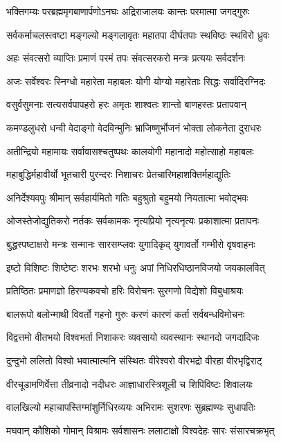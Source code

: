 \twolineshloka
{भक्तिगम्यः परब्रह्ममृगबाणार्पणोऽनघः}
{अद्रिराजालयः कान्तः परमात्मा जगद्गुरुः}

\twolineshloka
{सर्वकर्माचलस्त्वष्टा मङ्गल्यो मङ्गलावृतः}
{महातपा दीर्घतपाः स्थविष्ठः स्थविरो ध्रुवः}

\twolineshloka
{अहः संवत्सरो व्याप्तिः प्रमाणं परमं तपः}
{संवत्सरकरो मन्त्रः प्रत्ययः सर्वदर्शनः}

\twolineshloka
{अजः सर्वेश्वरः स्निग्धो महारेता महाबलः}
{योगी योग्यो महारेताः सिद्धः सर्वादिरग्निदः}

\twolineshloka
{वसुर्वसुमनाः सत्यसर्वपापहरो हरः}
{अमृतः शाश्वतः शान्तो बाणहस्तः प्रतापवान्}

\twolineshloka
{कमण्डलुधरो धन्वी वेदाङ्गो वेदविन्मुनिः}
{भ्राजिष्णुर्भोजनं भोक्ता लोकनेता दुराधरः}

\twolineshloka
{अतीन्द्रियो महामायः सर्वावासश्चतुष्पथः}
{कालयोगी महानादो महोत्साहो महाबलः}

\twolineshloka
{महाबुद्धिर्महावीर्यो भूतचारी पुरन्दरः}
{निशाचरः प्रेतचारिमहाशक्तिर्महाद्युतिः}

\twolineshloka
{अनिर्देश्यवपुः श्रीमान् सर्वहार्यमितो गतिः}
{बहुश्रुतो बहुमयो नियतात्मा भवोद्भवः}

\twolineshloka
{ओजस्तेजोद्युतिकरो नर्तकः सर्वकामकः}
{नृत्यप्रियो नृत्यनृत्यः प्रकाशात्मा प्रतापनः}

\twolineshloka
{बुद्धस्पष्टाक्षरो मन्त्रः सन्मानः सारसम्प्लवः}
{युगादिकृद् युगावर्तो गम्भीरो वृषवाहनः}

\twolineshloka
{इष्टो विशिष्टः शिष्टेष्टः शरभः शरभो धनुः}
{अपां निधिरधिष्ठानविजयो जयकालवित्}

\twolineshloka
{प्रतिष्ठितः प्रमाणज्ञो हिरण्यकवचो हरिः}
{विरोचनः सुरगणो विद्येशो विबुधाश्रयः}

\twolineshloka
{बालरूपो बलोन्माथी विवर्तो गहनो गुरुः}
{करणं कारणं कर्ता सर्वबन्धविमोचनः}

\twolineshloka
{विद्वत्तमो वीतभयो विश्वभर्ता निशाकरः}
{व्यवसायो व्यवस्थानः स्थानदो जगदादिजः}

\twolineshloka
{दुन्दुभो ललितो विश्वो भवात्मात्मनि संस्थितः}
{वीरेश्वरो वीरभद्रो वीरहा वीरभृद्विराट्}

\twolineshloka
{वीरचूडामणिर्वेत्ता तीव्रनादो नदीधरः}
{आज्ञाधारस्त्रिशूली च शिपिविष्टः शिवालयः}

\twolineshloka
{वालखिल्यो महाचापस्तिग्मांशुर्निधिरव्ययः}
{अभिरामः सुशरणः सुब्रह्मण्यः सुधापतिः}

\twolineshloka
{मघवान् कौशिको गोमान् विश्रामः सर्वशासनः}
{ललाटाक्षो विश्वदेहः सारः संसारचक्रभृत्}

